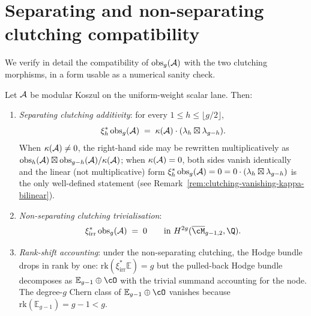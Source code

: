 \section{Separating and non-separating clutching compatibility}
\label{sec:clutching-compatibility}

We verify in detail the compatibility of $\mathrm{obs}_g(\mathcal{A})$
with the two clutching morphisms, in a form usable as a numerical
sanity check.

\begin{theorem}
\label{thm:separating-nonseparating-clutching-compatibility}
Let $\mathcal{A}$ be modular Koszul on the uniform-weight scalar lane.
Then:
\begin{enumerate}[label=\textup{(\roman*)}]
\item \emph{Separating clutching additivity}: for every
$1 \leq h \leq \lfloor g/2\rfloor$,
\[
\xi_h^*\,\mathrm{obs}_g(\mathcal{A})
\;=\; \kappa(\mathcal{A})\cdot (\lambda_h \boxtimes \lambda_{g-h}).
\]
When $\kappa(\mathcal{A}) \neq 0$, the right-hand side may be rewritten
multiplicatively as
$\mathrm{obs}_h(\mathcal{A})\boxtimes\mathrm{obs}_{g-h}(\mathcal{A})/\kappa(\mathcal{A})$;
when $\kappa(\mathcal{A}) = 0$, both sides vanish identically and the
linear (not multiplicative) form
$\xi_h^*\,\mathrm{obs}_g(\mathcal{A}) = 0
= 0 \cdot (\lambda_h \boxtimes \lambda_{g-h})$
is the only well-defined statement (see
Remark~\ref{rem:clutching-vanishing-kappa-bilinear}).
\item \emph{Non-separating clutching trivialisation}:
\[
\xi_{\mathrm{irr}}^*\,\mathrm{obs}_g(\cA) \;=\; 0
\qquad \text{in } H^{2g}(\overline{\cM}_{g-1,2},\Q).
\]
\item \emph{Rank-shift accounting}: under the non-separating
clutching, the Hodge bundle drops in rank by one:
$\mathrm{rk}(\xi_{\mathrm{irr}}^*\mathbb{E}) = g$ but the pulled-back
Hodge bundle decomposes as
$\mathbb{E}_{g-1}\oplus\cO$ with the trivial summand accounting
for the node. The degree-$g$ Chern class of $\mathbb{E}_{g-1}\oplus\cO$
vanishes because $\mathrm{rk}(\mathbb{E}_{g-1}) = g-1 < g$.
\end{enumerate}
\end{theorem}

